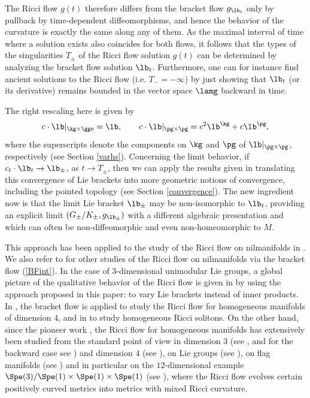 \documentclass[11pt]{amsart}
\theoremstyle{plain}
\theoremstyle{definition}
\theoremstyle{remark}
\begin{document}
The Ricci flow $g(t)$ therefore differs from the bracket flow $g_{\lb_t}$ only by pullback by time-dependent diffeomorphisms, and hence the behavior
of the curvature is exactly the same along any of them.  As the maximal interval of time where a solution exists also coincides for both flows, it follows that the types of the singularities $T_{\pm}$ of the Ricci flow solution $g(t)$ can be determined by analyzing the bracket flow solution $\lb_t$.  Furthermore, one can for instance find ancient solutions to the Ricci flow (i.e. $T_-=-\infty$) by just showing that $\lb_t$ (or its derivative) remains bounded in the vector space $\lamg$ backward in time.

The right rescaling here is given by
$$
c\cdot\lb|_{\kg\times\ggo}=\lb, \qquad c\cdot\lb|_{\pg\times\pg}=c^2\lb^{\kg}+c\lb^{\pg},
$$
where the superscripts denote the components on $\kg$ and $\pg$ of $\lb|_{\pg\times\pg}$, respectively (see Section \ref{varhs}).  Concerning the limit behavior, if $c_t\cdot\lb_t\to\lb_{\pm}$, as $t\to T_\pm$, then we can apply the results given in \cite{spacehm} translating this convergence of Lie brackets into more geometric notions of convergence, including the pointed topology  (see Section \ref{convergence}).  The new ingredient now is that the limit Lie bracket $\lb_{\pm}$ may be non-isomorphic to $\lb_t$, providing an explicit limit $(G_{\pm}/K_{\pm},g_{\lb_{\pm}})$ with a different algebraic presentation and which can often be non-diffeomorphic and even non-homeomorphic to $M$.

This approach has been applied to the study of the Ricci flow on nilmanifolds in \cite{nilricciflow}.  We also refer to \cite{Gzh,Pyn} for other studies of the Ricci flow on nilmanifolds via the bracket flow (\ref{BFint}).  In the case of $3$-dimensional unimodular Lie groups, a global picture of the qualitative behavior of the Ricci flow is given in \cite{GlcPyn} by using the approach proposed in this paper: to vary Lie brackets instead of inner products.  In \cite{Arr}, the bracket flow is applied to study the Ricci flow for homogeneous manifolds of dimension $4$, and in \cite{homRS} to study homogeneous Ricci solitons.  On the other hand, since the pioneer work \cite{IsnJck}, the Ricci flow for homogeneous manifolds has extensively been studied from the standard point of view in dimension $3$ (see \cite{KnpMcl,Glc,Ltt}, and for the backward case see \cite{CaoSlf}) and dimension $4$ (see \cite{IsnJckLu,Ltt}), on Lie groups (see \cite{nicebasis}), on flag manifolds (see \cite{GrmMrt, AnsChr}) and in particular on the $12$-dimensional example $\Spe(3)/\Spe(1)\times\Spe(1)\times\Spe(1)$ (see \cite{BhmWlk}), where the Ricci flow evolves certain positively curved metrics into metrics with mixed Ricci curvature.
\end{document}
